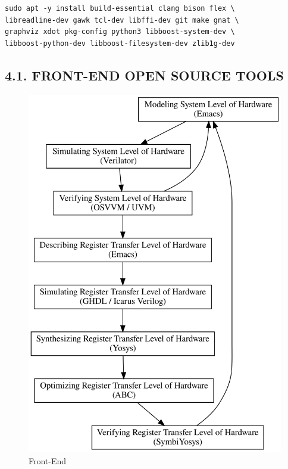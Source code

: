 \documentclass[
]{article}
\begin{document}
\begin{verbatim}
sudo apt -y install build-essential clang bison flex \
libreadline-dev gawk tcl-dev libffi-dev git make gnat \
graphviz xdot pkg-config python3 libboost-system-dev \
libboost-python-dev libboost-filesystem-dev zlib1g-dev
\end{verbatim}

\hypertarget{front-end-open-source-tools}{%
\subsection{4.1. FRONT-END OPEN SOURCE
TOOLS}\label{front-end-open-source-tools}}

\begin{figure}
\centering
\includegraphics{../doc/front-end.svg}
\caption{Front-End}
\end{figure}
\end{document}
